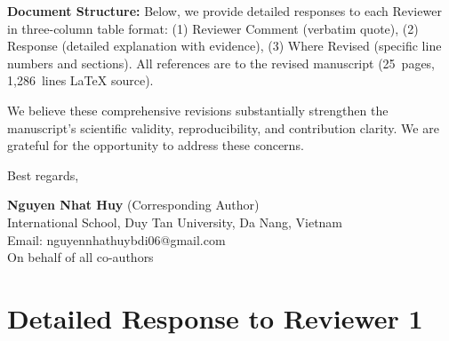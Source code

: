 \documentclass[11pt,a4paper]{article}
\begin{document}
\vspace{0.3em}
\noindent \textbf{Document Structure:} Below, we provide detailed responses to each Reviewer in three-column table format: (1) Reviewer Comment (verbatim quote), (2) Response (detailed explanation with evidence), (3) Where Revised (specific line numbers and sections). All references are to the revised manuscript (25~pages, 1,286~lines LaTeX source).

\vspace{0.3em}
\noindent We believe these comprehensive revisions substantially strengthen the manuscript's scientific validity, reproducibility, and contribution clarity. We are grateful for the opportunity to address these concerns.

\vspace{0.5em}
\noindent Best regards,

\noindent \textbf{Nguyen Nhat Huy} (Corresponding Author)\\
International School, Duy Tan University, Da Nang, Vietnam\\
Email: nguyennhathuybdi06@gmail.com\\
On behalf of all co-authors


\section*{Detailed Response to Reviewer 1}
\end{document}
